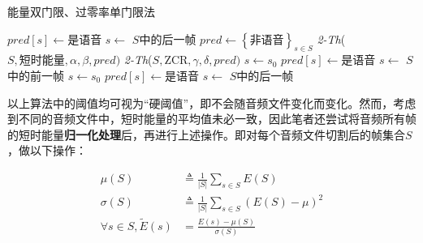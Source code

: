 \documentclass[a4paper]{article}
\begin{document}
\begin{algorithm}
        \caption{能量双门限、过零率单门限法}
        
        {
	        {
	            {
	                $pred[s]\gets \text{是语音}$\;
	                $s\gets$ $S$中的后一帧\;
	            }
            }
        }
        \BlankLine
        \BlankLine
	    {
	        $pred\gets\left\{\text{非语音}\right\}_{s\in S}$\;
	        \BlankLine
	        \BlankLine
	        \textit{2-Th}($S,\text{短时能量},\alpha,\beta,pred)$\;
            \textit{2-Th}($S,$ZCR$,\gamma,\delta,pred)$\;
            {
                $s\gets s_0$\;
                {
                $pred[s]\gets$是语音\;
                $s\gets$ $S$中的前一帧\;
                }
                $s\gets s_0$\;
                {
                $pred[s]\gets$是语音\;
                $s\gets$ $S$中的后一帧\;
                }
	        }
	   }
    \end{algorithm}

以上算法中的阈值均可视为“硬阈值”，即不会随音频文件变化而变化。然而，考虑到不同的音频文件中，短时能量的平均值未必一致，因此笔者还尝试将音频所有帧的短时能量\textbf{归一化处理}后，再进行上述操作。即对每个音频文件切割后的帧集合$S$，做以下操作：

\vspace{-1em}
\begin{align*}
    \mu(S) & \triangleq \frac{1}{|S|}\sum_{s\in S}E(S) \\
    \sigma(S) & \triangleq \frac{1}{|S|}\sum_{s\in S}(E(S)-\mu)^2 \\
    \forall s\in S, \tilde{E}(s) &= \frac{E(s)-\mu(S)}{\sigma(S)} \\
\end{align*}
\end{document}
